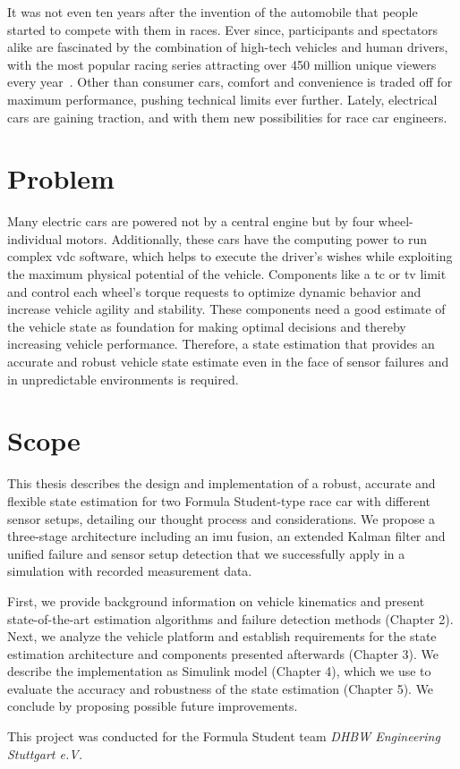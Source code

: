 It was not even ten years after the invention of the automobile that people started to compete with them in races. Ever since, participants and spectators alike are fascinated by the combination of high-tech vehicles and human drivers, with the most popular racing series attracting over 450 million unique viewers every year~\cite{FormulaOneWorldChampionshipLimited.2020}. Other than consumer cars, comfort and convenience is traded off for maximum performance, pushing technical limits ever further. Lately, electrical cars are gaining traction, and with them new possibilities for race car engineers.

\section{Problem}
Many electric cars are powered not by a central engine but by four wheel-individual motors. Additionally, these cars have the computing power to run complex \glsdesc{vdc} software, which helps to execute the driver's wishes while exploiting the maximum physical potential of the vehicle. Components like a \glsdesc{tc} or \glsdesc{tv} limit and control each wheel's torque requests to optimize dynamic behavior and increase vehicle agility and stability. These components need a good estimate of the vehicle state as foundation for making optimal decisions and thereby increasing vehicle performance. Therefore, a state estimation that provides an accurate and robust vehicle state estimate even in the face of sensor failures and in unpredictable environments is required.

\section{Scope}
This thesis describes the design and implementation of a robust, accurate and flexible state estimation for two Formula Student-type race car with different sensor setups, detailing our thought process and considerations. We propose a three-stage architecture including an \glsdesc{imu} fusion, an extended Kalman filter and unified failure and sensor setup detection that we successfully apply in a simulation with recorded measurement data.

First, we provide background information on vehicle kinematics and present state-of-the-art estimation algorithms and failure detection methods (Chapter 2). Next, we analyze the vehicle platform and establish requirements for the state estimation architecture and components presented afterwards (Chapter 3). We describe the implementation as Simulink model (Chapter 4), which we use to evaluate the accuracy and robustness of the state estimation (Chapter 5). We conclude by proposing possible future improvements.

This project was conducted for the Formula Student team \textit{DHBW Engineering Stuttgart e.V.}
